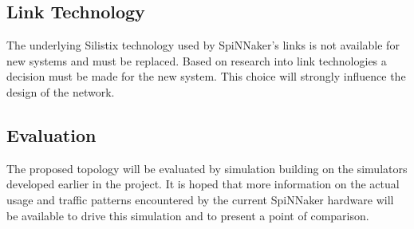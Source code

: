 		\subsection{Link Technology}
			
			
			The underlying Silistix technology used by SpiNNaker's links is not
			available for new systems and must be replaced. Based on research into
			link technologies a decision must be made for the new system. This choice
			will strongly influence the design of the network.
		
		
		\subsection{Evaluation}
			
			The proposed topology will be evaluated by simulation building on the
			simulators developed earlier in the project. It is hoped that more
			information on the actual usage and traffic patterns encountered by the
			current SpiNNaker hardware will be available to drive this simulation and
			to present a point of comparison.
		
